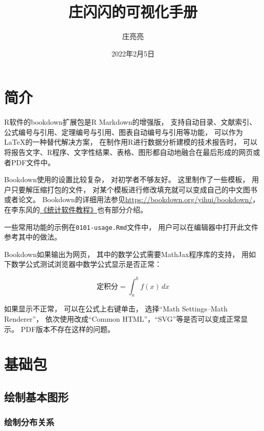 \documentclass[
]{book}
\title{庄闪闪的可视化手册}
\author{庄亮亮}
\date{2022年2月5日}
\begin{document}
\maketitle

{
\setcounter{tocdepth}{1}
\tableofcontents
}
\hypertarget{ux7b80ux4ecb}{%
\chapter*{简介}\label{ux7b80ux4ecb}}

R软件的bookdown扩展包是R Markdown的增强版，
支持自动目录、文献索引、公式编号与引用、定理编号与引用、图表自动编号与引用等功能，
可以作为LaTeX的一种替代解决方案，
在制作用R进行数据分析建模的技术报告时，
可以将报告文字、R程序、文字性结果、表格、图形都自动地融合在最后形成的网页或者PDF文件中。

Bookdown使用的设置比较复杂，
对初学者不够友好。
这里制作了一些模板，
用户只要解压缩打包的文件，
对某个模板进行修改填充就可以变成自己的中文图书或者论文。
Bookdown的详细用法参见\url{https://bookdown.org/yihui/bookdown/}，
在李东风的\href{http://www.math.pku.edu.cn/teachers/lidf/docs/Rbook/html/_Rbook/index.html}{《统计软件教程》}也有部分介绍。

一些常用功能的示例在\texttt{0101-usage.Rmd}文件中，
用户可以在编辑器中打开此文件参考其中的做法。

Bookdown如果输出为网页，
其中的数学公式需要MathJax程序库的支持，
用如下数学公式测试浏览器中数学公式显示是否正常：

\[
\text{定积分} = \int_a^b f(x) \,dx
\]

如果显示不正常，
可以在公式上右键单击，
选择``Math Settings--Math Renderer''，
依次使用改成``Common HTML''，``SVG''等是否可以变成正常显示。
PDF版本不存在这样的问题。

\hypertarget{causal}{%
\chapter{基础包}\label{causal}}

\hypertarget{ux7ed8ux5236ux57faux672cux56feux5f62}{%
\section{绘制基本图形}\label{ux7ed8ux5236ux57faux672cux56feux5f62}}

\hypertarget{ux7ed8ux5236ux5206ux5e03ux5173ux7cfb}{%
\subsection{绘制分布关系}\label{ux7ed8ux5236ux5206ux5e03ux5173ux7cfb}}
\end{document}
